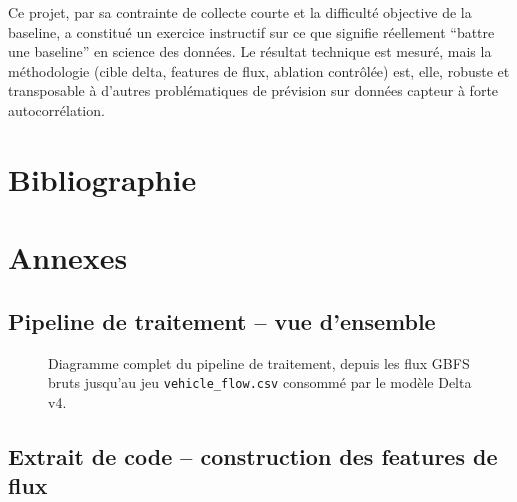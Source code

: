 \documentclass[fleqn, 12pt]{scrartcl}
\begin{document}
\vspace{0.5cm}

Ce projet, par sa contrainte de collecte courte et la difficulté objective de la baseline, a constitué un exercice instructif sur ce que signifie réellement ``battre une baseline'' en science des données. Le résultat technique est mesuré, mais la méthodologie (cible delta, features de flux, ablation contrôlée) est, elle, robuste et transposable à d'autres problématiques de prévision sur données capteur à forte autocorrélation.



\newpage

\section[Bibliographie]{Bibliographie}
\label{sec:biblio}





\newpage

\section*{Annexes}

\subsection*{Pipeline de traitement -- vue d'ensemble}

\begin{figure}[htp]
    \caption{Diagramme complet du pipeline de traitement, depuis les flux GBFS bruts jusqu'au jeu \texttt{vehicle\_flow.csv} consommé par le modèle Delta v4.}
    \label{fig:annexe_pipeline}
\end{figure}

\newpage
\subsection*{Extrait de code -- construction des features de flux}
\end{document}
